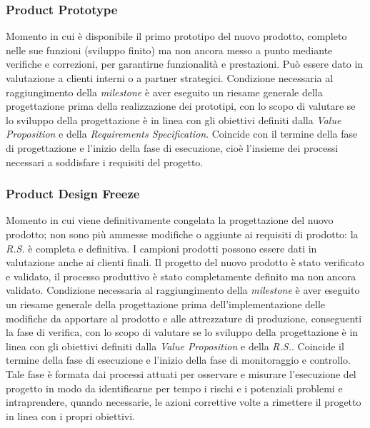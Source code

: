 \subsubsection{Product Prototype}
Momento in cui è disponibile il primo prototipo del nuovo prodotto, completo nelle sue funzioni (sviluppo finito) ma non ancora messo a punto mediante verifiche e correzioni, per garantirne funzionalità e prestazioni. Può essere dato in valutazione a clienti interni o a partner strategici. Condizione necessaria al raggiungimento della \emph{milestone} è aver eseguito un riesame generale della progettazione prima della realizzazione dei prototipi, con lo scopo di valutare se lo sviluppo della progettazione è in linea con gli obiettivi definiti dalla \emph{Value Proposition} e della \emph{Requirements Specification}. Coincide con il termine della fase di progettazione e l'inizio della fase di esecuzione, cioè l'insieme dei processi necessari a soddisfare i requisiti del progetto.\\

\subsubsection{Product Design Freeze}
Momento in cui viene definitivamente congelata la progettazione
del nuovo prodotto; non sono più ammesse modifiche o aggiunte ai requisiti
di prodotto: la \emph{R.S.} è completa e definitiva. I campioni prodotti possono essere
dati in valutazione anche ai clienti finali. Il progetto del nuovo prodotto è stato
verificato e validato, il processo produttivo è stato completamente definito ma non
ancora validato. Condizione necessaria al raggiungimento della \emph{milestone} è aver
eseguito un riesame generale della progettazione prima dell'implementazione delle
modifiche da apportare al prodotto e alle attrezzature di produzione, conseguenti
la fase di verifica, con lo scopo di valutare se lo sviluppo della progettazione è in
linea con gli obiettivi definiti dalla \emph{Value Proposition} e della \emph{R.S.}. Coincide il
termine della fase di esecuzione e l'inizio della fase di monitoraggio e controllo.
Tale fase è formata dai processi attuati per osservare e misurare l'esecuzione del
progetto in modo da identificarne per tempo i rischi e i potenziali problemi e intraprendere,
quando necessarie, le azioni correttive volte a rimettere il progetto
in linea con i propri obiettivi.\\

